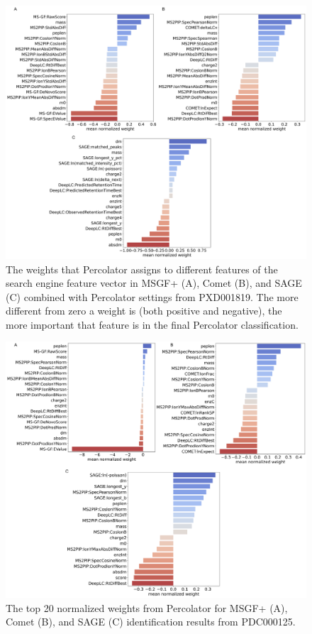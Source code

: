 \documentclass[12pt]{article}
\begin{document}
\renewcommand\thefigure{S\arabic{figure}}
\setcounter{figure}{0}

\begin{figure}[h!]
	\centering
	\includegraphics[width=1\textwidth]{figures//LFQ_weights.png}
	\caption{The weights that Percolator assigns to different features of the search engine feature vector in MSGF+ (A), Comet (B), and SAGE (C) combined with Percolator settings from PXD001819. The more different from zero a weight is (both positive and negative), the more important that feature is in the final Percolator classification.}
	\label{fig:PXD001819_svm_weights}
\end{figure}

\begin{figure}[h!]
	\centering
	\includegraphics[width=1\textwidth]{figures//CPTAC_weights.png}
	\caption{The top 20 normalized weights from Percolator for MSGF+ (A), Comet (B), and SAGE (C) identification results from PDC000125.}
	\label{fig:PDC_ms2rescore_weights}
\end{figure}
\end{document}
